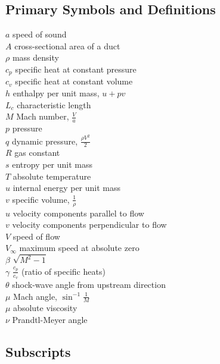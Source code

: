 \subsection*{Primary Symbols and Definitions}

\begin{multicols}{2}
\noindent$a$ \quad speed of sound \\
$A$ \quad cross-sectional area of a duct \\
$\rho$ \quad mass density \\
$c_p$ \quad specific heat at constant pressure \\
$c_v$ \quad specific heat at constant volume \\
$h$ \quad enthalpy per unit mass, $ u + pv $ \\
$L_c$ \quad characteristic length \\
$M$ \quad Mach number, $ \frac{V}{a} $ \\
$p$ \quad pressure \\
$q$ \quad dynamic pressure, $ \frac{\rho V^2}{2} $ \\
$R$ \quad gas constant \\
$s$ \quad entropy per unit mass \\
$T$ \quad absolute temperature \\
$u$ \quad internal energy per unit mass \\
$v$ \quad specific volume, $ \frac{1}{\rho} $ \\
$u$ \quad velocity components parallel to flow \\
$v$ \quad velocity components perpendicular to flow \\
$V$ \quad speed of flow \\
$V_\infty$ \quad maximum speed at absolute zero\\
$\beta$ \quad $ \sqrt{M^2 - 1} $ \\
$\gamma$ \quad $ \frac{c_p}{c_v} $ (ratio of specific heats) \\
$\theta$ \quad shock-wave angle from upstream direction \\
$\mu$ \quad Mach angle, $ \sin^{-1} \frac{1}{M} $ \\
$\mu$ \quad absolute viscosity \\
$\nu$ \quad Prandtl-Meyer angle \\
\end{multicols}

\subsection*{Subscripts}

